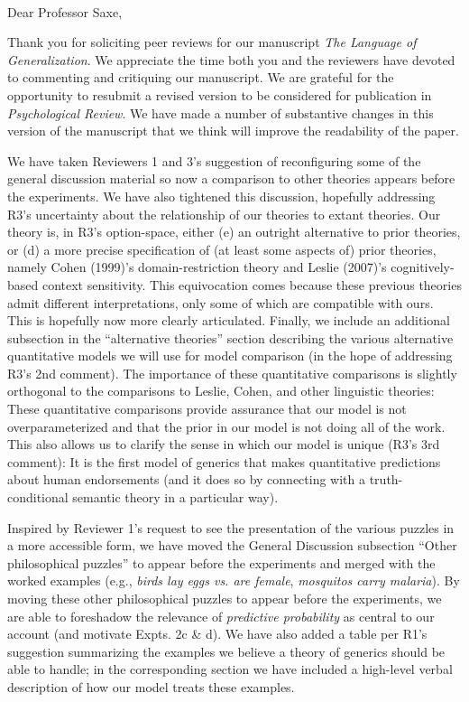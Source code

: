 \documentclass[11pt,letterpaper]{letter} %
\def\opening#1{\thispagestyle{empty}
{\centering\fromaddress \vspace{0.6in} \\ %
\hspace*{\longindentation}\hspace*{\fill}\par} %
\vspace{0.4in} %
\noindent #1 %
}
\begin{document}
\begin{letter}

\opening{Dear Professor Saxe,}

Thank you for soliciting peer reviews for our manuscript \emph{The Language of Generalization}. We appreciate the time both you and the reviewers have devoted to commenting and critiquing our manuscript. We are grateful for the opportunity to resubmit a revised version to be considered for publication in \emph{Psychological Review}.
We have made a number of substantive changes in this version of the manuscript that we think will improve the readability of the paper.

We have taken Reviewers 1 and 3's suggestion of reconfiguring some of the general discussion material so now a comparison to other theories appears before the experiments.
We have also tightened this discussion, hopefully addressing R3's uncertainty about the relationship of our theories to extant theories. 
Our theory is, in R3's option-space, either (e) an outright alternative to prior theories, or (d) a more precise specification of (at least some aspects of) prior theories, namely Cohen (1999)'s domain-restriction theory and Leslie (2007)'s cognitively-based context sensitivity. This equivocation comes because these previous theories admit different interpretations, only some of which are compatible with ours. This is hopefully now more clearly articulated.
Finally, we include an additional subsection in the ``alternative theories'' section describing the various alternative quantitative models we will use for model comparison (in the hope of addressing R3's 2nd comment). 
The importance of these quantitative comparisons is slightly orthogonal to the comparisons to Leslie, Cohen, and other linguistic theories: These quantitative comparisons provide assurance that our  model is not overparameterized and that the prior in our model is not doing all of the work. 
This also allows us to clarify the sense in which our model is unique (R3's 3rd comment): It is the first model of generics that makes quantitative predictions about human endorsements (and it does so by connecting with a truth-conditional semantic theory in a particular way). 

Inspired by Reviewer 1's request to see the presentation of the various puzzles in a more accessible form,
we have moved the General Discussion subsection ``Other philosophical puzzles'' to appear before the experiments and merged with the worked examples (e.g., \emph{birds lay eggs vs. are female}, \emph{mosquitos carry malaria}).
By moving these other philosophical puzzles to appear before the experiments, we are able to foreshadow the relevance of \emph{predictive probability} as central to our account (and motivate Expts. 2c \& d).
We have also added a table per R1's suggestion summarizing the examples we believe a theory of generics should be able to handle; in the corresponding section we have included a high-level verbal description of how our model treats these examples. 


\end{letter}
\end{document}
